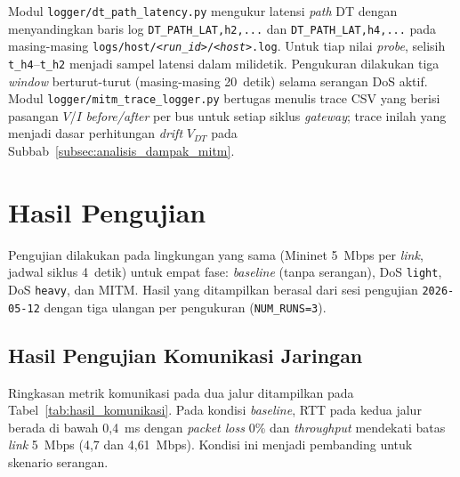 Modul \texttt{logger/dt\_path\_latency.py} mengukur latensi \textit{path} \ac{DT} dengan menyandingkan baris log \texttt{DT\_PATH\_LAT,h2,...} dan \texttt{DT\_PATH\_LAT,h4,...} pada masing-masing \texttt{logs/host/\textit{<run\_id>}/\textit{<host>}.log}. Untuk tiap nilai \textit{probe}, selisih \texttt{t\_h4}--\texttt{t\_h2} menjadi sampel latensi dalam milidetik. Pengukuran dilakukan tiga \textit{window} berturut-turut (masing-masing 20~detik) selama serangan \ac{DoS} aktif. Modul \texttt{logger/mitm\_trace\_logger.py} bertugas menulis trace CSV yang berisi pasangan $V$/$I$ \textit{before/after} per bus untuk setiap siklus \textit{gateway}; trace inilah yang menjadi dasar perhitungan \textit{drift} $V_{DT}$ pada Subbab~\ref{subsec:analisis_dampak_mitm}.

\section{Hasil Pengujian}
\label{sec:hasil_pengujian}
Pengujian dilakukan pada lingkungan yang sama (Mininet 5~Mbps per \textit{link}, jadwal siklus 4~detik) untuk empat fase: \textit{baseline} (tanpa serangan), \ac{DoS} \texttt{light}, \ac{DoS} \texttt{heavy}, dan \ac{MITM}. Hasil yang ditampilkan berasal dari sesi pengujian \texttt{2026-05-12} dengan tiga ulangan per pengukuran (\texttt{NUM\_RUNS=3}).

\subsection{Hasil Pengujian Komunikasi Jaringan}
\label{subsec:hasil_pengujian_komunikasi_jaringan}
Ringkasan metrik komunikasi pada dua jalur ditampilkan pada Tabel~\ref{tab:hasil_komunikasi}. Pada kondisi \textit{baseline}, RTT pada kedua jalur berada di bawah 0{,}4~ms dengan \textit{packet loss} 0\% dan \textit{throughput} mendekati batas \textit{link} 5~Mbps (4{,}7 dan 4{,}61~Mbps). Kondisi ini menjadi pembanding untuk skenario serangan.

